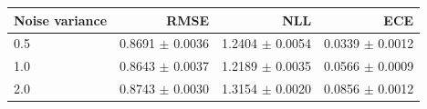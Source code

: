 \begin{tabular}{@{}lrrr@{}}\toprule
Noise variance & RMSE & NLL & ECE\\\midrule
0.5 & 0.8691 $\pm$ 0.0036 & 1.2404 $\pm$ 0.0054 & 0.0339 $\pm$ 0.0012\\
1.0 & 0.8643 $\pm$ 0.0037 & 1.2189 $\pm$ 0.0035 & 0.0566 $\pm$ 0.0009\\
2.0 & 0.8743 $\pm$ 0.0030 & 1.3154 $\pm$ 0.0020 & 0.0856 $\pm$ 0.0012\\
\bottomrule\end{tabular}
